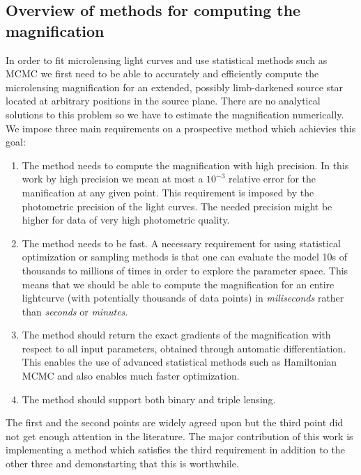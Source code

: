 \documentclass[12pt,dvipsnames]{report}
\begin{document}
\subsection{Overview of methods for computing the magnification}
In order to fit microlensing light curves and use statistical methods such as
MCMC we first need to be able to accurately and efficiently compute the
microlensing magnification for an extended, possibly limb-darkened source star
located at arbitrary positions in the source plane. There are no analytical
solutions to this problem so we have to estimate the magnification numerically.
We impose three main requirements on a prospective method which achievies this
goal:
\begin{enumerate}
    \item The method needs to compute the magnification with high precision. In this work
          by high precision we mean at most a $10^{-3}$ relative error for the
          manification at any given point. This requirement is imposed by the photometric
          precision of the light curves. The needed precision might be higher for data of
          very high photometric quality.
    \item The method needs to be fast. A necessary requirement for using statistical
          optimization or sampling methods is that one can evaluate the model 10s of
          thousands to millions of times in order to explore the parameter space. This
          means that we should be able to compute the magnification for an entire
          lightcurve (with potentially thousands of data points) in \emph{miliseconds}
          rather than \emph{seconds} or \emph{minutes}.
    \item The method should return the exact gradients of the magnification with respect
          to all input parameters, obtained through automatic differentiation. This
          enables the use of advanced statistical methods such as Hamiltonian MCMC and
          also enables much faster optimization.
    \item  The method should support both binary and triple lensing.
\end{enumerate}
The first and the second points are widely agreed upon but the third point did not
get enough attention in the literature. The major contribution of this work is
implementing a method which satisfies the third requirement in addition to the
other three and demonstarting that this is worthwhile.
\end{document}
